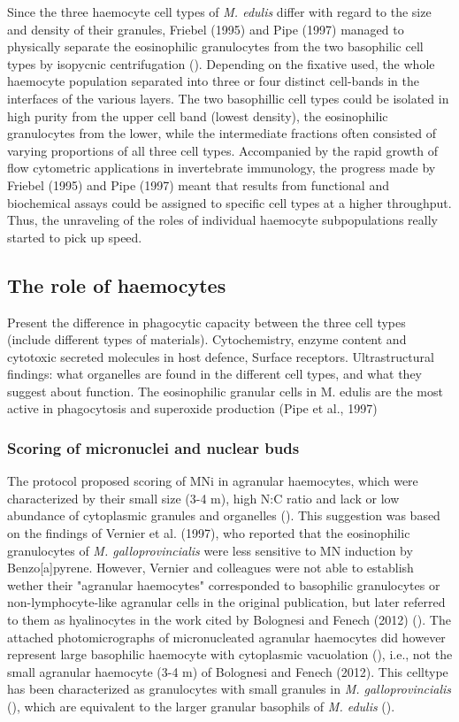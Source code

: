 Since the three haemocyte cell types of \emph{M. edulis} differ with regard to the size and density of their granules, Friebel (1995) and Pipe (1997) managed to physically separate the eosinophilic granulocytes from the two basophilic cell types by isopycnic centrifugation (\cite{Friebel1995, Pipe1997}). Depending on the fixative used, the whole haemocyte population separated into three or four distinct cell-bands in the interfaces of the various layers. The two basophillic cell types could be isolated in high purity from the upper cell band (lowest density), the eosinophilic granulocytes from the lower, while the intermediate fractions often consisted of varying proportions of all three cell types. Accompanied by the rapid growth of flow cytometric applications in invertebrate immunology, the progress made by Friebel (1995) and Pipe (1997) meant that results from functional and biochemical assays could be assigned to specific cell types at a higher throughput. Thus, the unraveling of the roles of individual haemocyte subpopulations really started to pick up speed.

\subsection{The role of haemocytes}
Present the difference in phagocytic capacity between the three cell types (include different types of materials).
Cytochemistry, enzyme content and cytotoxic secreted molecules in host defence, Surface receptors.
Ultrastructural findings: what organelles are found in the different cell types, and what they suggest about function.
The  eosinophilic granular cells in  M. edulis are the most active in phagocytosis and superoxide production (Pipe  et al., 1997)


\subsubsection{Scoring of micronuclei and nuclear buds}
The protocol proposed scoring of MNi in agranular haemocytes, which were characterized by their small size (3-4 \micro m), high N:C ratio and lack or low abundance of cytoplasmic granules and organelles (\cite{Bolognesi2012}). This suggestion was based on the findings of Vernier et al. (1997), who reported that the eosinophilic granulocytes of \emph{M. galloprovincialis} were less sensitive to MN induction by Benzo[a]pyrene. However, Vernier and colleagues were not able to establish wether their "agranular haemocytes" corresponded to basophilic granulocytes or non-lymphocyte-like agranular cells in the original publication, but later referred to them as hyalinocytes in the work cited by Bolognesi and Fenech (2012) (\cite{Dolcetti2002}). The attached photomicrographs of micronucleated agranular haemocytes did however represent large basophilic haemocyte with cytoplasmic vacuolation (\cite{Venier1997, Dolcetti2002}), i.e., not the small agranular haemocyte (3-4 \micro m) of Bolognesi and Fenech (2012). This celltype has been characterized as granulocytes with small granules in \emph{M. galloprovincialis} (\cite{Carballal1997}), which are equivalent to the larger granular basophils of \emph{M. edulis} (\cite{Moore1977}).

